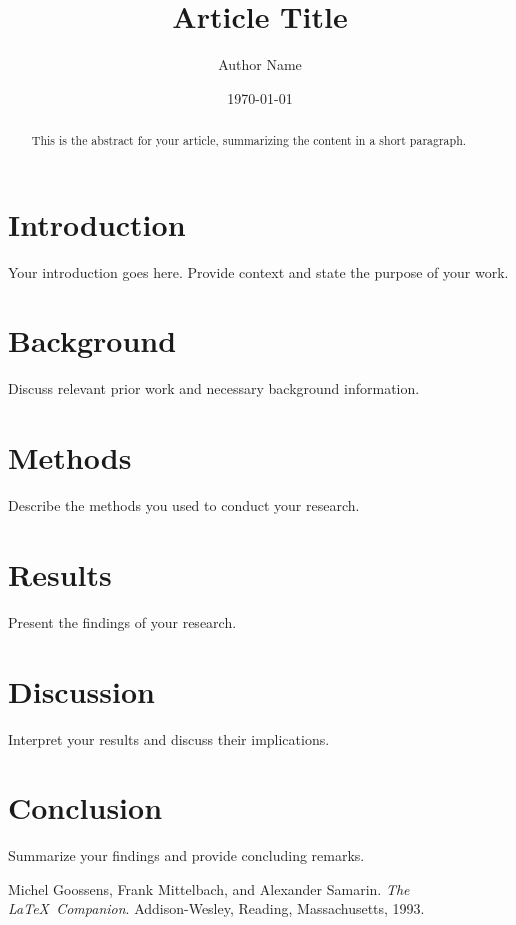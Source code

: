 \documentclass[12pt, letterpaper]{article}
\title{Article Title}
\author{Author Name}
\date{\today}
\begin{document}
\maketitle

\begin{abstract}
This is the abstract for your article, summarizing the content in a short paragraph.
\end{abstract}

\section{Introduction}
Your introduction goes here. Provide context and state the purpose of your work.

\section{Background}
Discuss relevant prior work and necessary background information.

\section{Methods}
Describe the methods you used to conduct your research.

\section{Results}
Present the findings of your research.

\section{Discussion}
Interpret your results and discuss their implications.

\section{Conclusion}
Summarize your findings and provide concluding remarks.

\begin{thebibliography}{9}
Michel Goossens, Frank Mittelbach, and Alexander Samarin. 
\textit{The \LaTeX\ Companion}. 
Addison-Wesley, Reading, Massachusetts, 1993.
\end{thebibliography}
\end{document}
